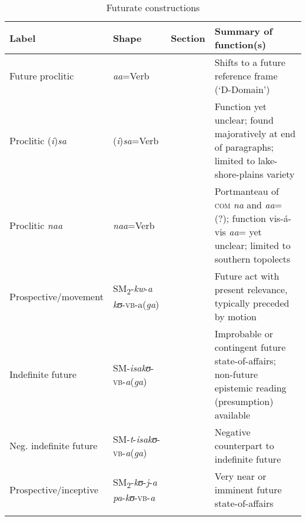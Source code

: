 \begin{sidewaystable}
	\begin{tabularx}{\textwidth}{lllX}
		\lsptoprule
		\footnotesize{Label} & \footnotesize{Shape} &\footnotesize{Section} & \footnotesize{Summary of function(s)}\\
		\midrule
		Future proclitic & \textit{aa}=Verb & \sectref{ProcliticAa} & Shifts to a future reference frame (\lq D-Domain')\\
		Proclitic (\textit{i})\textit{sa} & (\textit{i})\textit{sa}=Verb & \sectref{ProcliticIsa} & Function yet unclear; found majoratively at end of paragraphs; limited to lake-shore-plains variety\\
		Proclitic \textit{naa} & \textit{naa}=Verb & \sectref{ProcliticNaa}  & Portmanteau of \textsc{com} \textit{na} and \textit{aa}= (?); function vis-á-vis \textit{aa}= yet unclear; limited to southern topolects\\
		Prospective/movement & SM\textsubscript{2}-\textit{kw}-\textit{a} \textit{kʊ}-\textsc{vb}-a(\textit{ga}) & \sectref{Prospectivekwa} & Future act with present relevance, typically preceded by motion\\
		Indefinite future & SM-\textit{isakʊ}-\textsc{vb}-\textit{a}(\textit{ga}) & \sectref{isaFut} &  Improbable or contingent future state-of-affairs; non-future epistemic reading (presumption) available\\
		Neg. indefinite future & SM-\textit{t}-\textit{isakʊ}-\textsc{vb}-\textit{a}(\textit{ga}) &  \sectref{isaFut} & Negative counterpart to indefinite future\\
		Prospective/inceptive & SM\textsubscript{2}-\textit{kʊ}-\textit{j}-\textit{a} \textit{pa}-\textit{kʊ}-\textsc{vb}-\textit{a} & \sectref {ProspectiveKujapa} & Very near or imminent future state-of-affairs\\
		\lspbottomrule
	\end{tabularx}	
	\caption{Futurate constructions}\label{tabAppendixFuturates}
\end{sidewaystable}	

